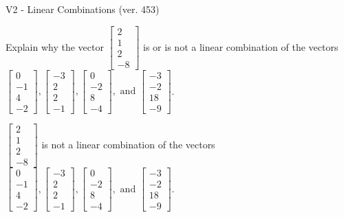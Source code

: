 \begin{exercise}
  \begin{exerciseTitle}V2 - Linear Combinations (ver. 453)\end{exerciseTitle}
  \begin{exerciseStatement}
    Explain why the vector \(\left[\begin{array}{c}
2 \\
1 \\
2 \\
-8
\end{array}\right]\)  is or is not a linear 
	combination of the vectors \(\left[\begin{array}{c}
0 \\
-1 \\
4 \\
-2
\end{array}\right] , \left[\begin{array}{c}
-3 \\
2 \\
2 \\
-1
\end{array}\right] , \left[\begin{array}{c}
0 \\
-2 \\
8 \\
-4
\end{array}\right] , \text{ and } \left[\begin{array}{c}
-3 \\
-2 \\
18 \\
-9
\end{array}\right]\).
	


  \end{exerciseStatement}
  \begin{exerciseAnswer}
   \(\left[\begin{array}{c}
2 \\
1 \\
2 \\
-8
\end{array}\right]\) 
  	 is not  
	a linear combination of the vectors \(\left[\begin{array}{c}
0 \\
-1 \\
4 \\
-2
\end{array}\right] , \left[\begin{array}{c}
-3 \\
2 \\
2 \\
-1
\end{array}\right] , \left[\begin{array}{c}
0 \\
-2 \\
8 \\
-4
\end{array}\right] , \text{ and } \left[\begin{array}{c}
-3 \\
-2 \\
18 \\
-9
\end{array}\right]\).


\end{exerciseAnswer}
\end{exercise}

